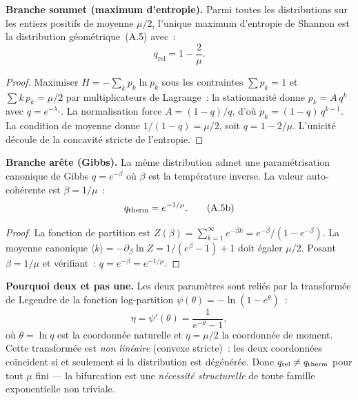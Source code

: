 \documentclass[12pt,a4paper]{article}
\providecommand{\qrel}{\ensuremath{q_{\mathrm{rel}}}}
\begin{document}
\begin{theorembox}

\textbf{Branche sommet (maximum d'entropie).}
Parmi toutes les distributions sur les entiers positifs de
moyenne $\mu/2$, l'unique maximum d'entropie de Shannon est la
distribution g\'eom\'etrique~(A.5) avec~:
\begin{equation}
  \qrel = 1 - \frac{2}{\mu}.
  \tag{A.5a}
\end{equation}

\begin{proof}
Maximiser $H = -\sum_k p_k \ln p_k$ sous les contraintes $\sum p_k = 1$
et $\sum k\,p_k = \mu/2$ par multiplicateurs de Lagrange~: la
stationnarit\'e donne $p_k = A\,q^k$ avec $q = e^{-\lambda_1}$. La
normalisation force $A = (1-q)/q$, d'o\`u $p_k = (1-q)\,q^{k-1}$.
La condition de moyenne donne $1/(1-q) = \mu/2$, soit $q = 1 - 2/\mu$.
L'unicit\'e d\'ecoule de la concavit\'e stricte de l'entropie.
\end{proof}

\textbf{Branche ar\^ete (Gibbs).}
La m\^eme distribution admet une param\'etrisation canonique de Gibbs
$q = e^{-\beta}$ o\`u $\beta$ est la temp\'erature inverse. La
valeur auto-coh\'erente est $\beta = 1/\mu$~:
\begin{equation}
  q_{\mathrm{therm}} = e^{-1/\mu}.
  \tag{A.5b}
\end{equation}

\begin{proof}
La fonction de partition est
$Z(\beta) = \sum_{k=1}^{\infty} e^{-\beta k} = e^{-\beta}/(1-e^{-\beta})$.
La moyenne canonique $\langle k \rangle = -\partial_\beta \ln Z = 1/(e^\beta - 1) + 1$
doit \'egaler $\mu/2$. Posant $\beta = 1/\mu$ et v\'erifiant~:
$q = e^{-\beta} = e^{-1/\mu}$.
\end{proof}

\textbf{Pourquoi deux et pas une.}
Les deux param\`etres sont reli\'es par la transform\'ee de Legendre
de la fonction log-partition $\psi(\theta) = -\ln(1-e^\theta)$~:
\[
  \eta = \psi'(\theta) = \frac{1}{e^{-\theta} - 1},
\]
o\`u $\theta = \ln q$ est la coordonn\'ee naturelle et $\eta = \mu/2$
la coordonn\'ee de moment. Cette transform\'ee est \emph{non lin\'eaire}
(convexe stricte)~: les deux coordonn\'ees co\"incident si et
seulement si la distribution est d\'eg\'en\'er\'ee. Donc
$\qrel \neq \qtherm$ pour tout $\mu$ fini --- la bifurcation est une
\emph{n\'ecessit\'e structurelle} de toute famille exponentielle non
triviale.
\end{theorembox}
\end{document}
